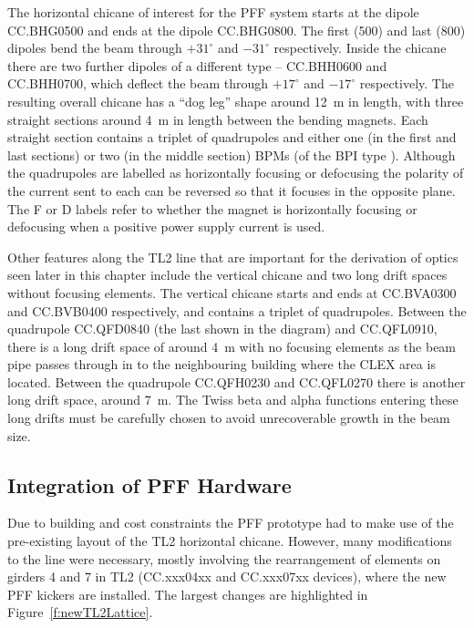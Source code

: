 The horizontal chicane of interest for the PFF system starts at the dipole CC.BHG0500 and ends at the dipole CC.BHG0800. The first (500) and last (800) dipoles bend the beam through \(+31^\circ\) and \(-31^\circ\) respectively. Inside the chicane there are two further dipoles of a different type -- CC.BHH0600 and CC.BHH0700, which deflect the beam through \(+17^\circ\) and \(-17^\circ\) respectively. 
The resulting overall chicane has a ``dog leg'' shape around 12~m in length, with three straight sections around 4~m in length between the bending magnets. Each straight section contains a triplet of quadrupoles and either one (in the first and last sections) or two (in the middle section) BPMs (of the BPI type \cite{bpi}). Although the quadrupoles are labelled as horizontally focusing or defocusing the polarity of the current sent to each can be reversed so that it focuses in the opposite plane. The F or D labels refer to whether the magnet is horizontally focusing or defocusing when a positive power supply current is used.

Other features along the TL2 line that are important for the derivation of optics seen later in this chapter include the vertical chicane and two long drift spaces without focusing elements. The vertical chicane starts and ends at CC.BVA0300 and CC.BVB0400 respectively, and contains a triplet of quadrupoles. Between the quadrupole CC.QFD0840 (the last shown in the diagram) and CC.QFL0910, there is a long drift space of around 4~m with no focusing elements as the beam pipe passes through in to the neighbouring building where the CLEX area is located. Between the quadrupole CC.QFH0230 and CC.QFL0270 there is another long drift space, around 7~m. The Twiss beta and alpha functions entering these long drifts must be carefully chosen to avoid unrecoverable growth in the beam size.

\subsection{Integration of PFF Hardware}
\label{ss:tl2PFFIntegration}

Due to building and cost constraints the PFF prototype had to make use of the pre-existing layout of the TL2 horizontal chicane. However, many modifications to the line were necessary, mostly involving the rearrangement of elements on girders 4 and 7 in TL2 (CC.xxx04xx and CC.xxx07xx devices), where the new PFF kickers are installed. The largest changes are highlighted in Figure~\ref{f:newTL2Lattice}.

